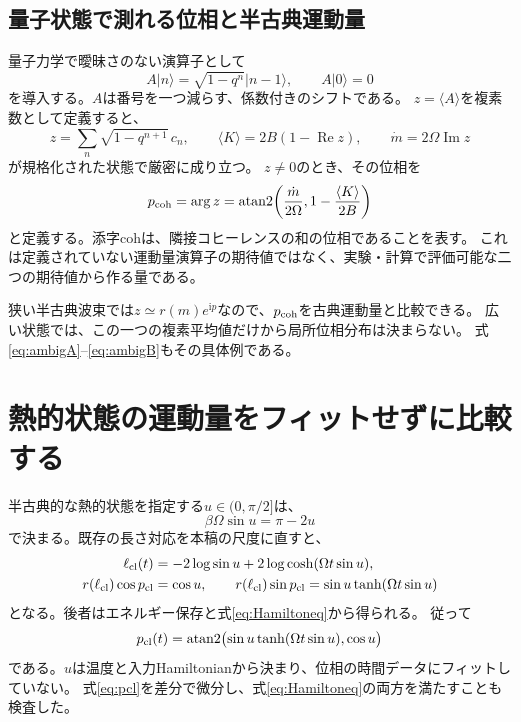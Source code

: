 \documentclass[a4paper,11pt]{ltjsarticle}
\numberwithin{equation}{section}
\newcommand{\ket}[1]{\lvert #1\rangle}
\newcommand{\ii}{\mathrm i}
\begin{document}
\subsection{量子状態で測れる位相と半古典運動量}
量子力学で曖昧さのない演算子として
\begin{equation}
 A\ket n=\sqrt{1-q^n}\ket{n-1},\qquad A\ket0=0
 \label{eq:A}
\end{equation}
を導入する。$A$は番号を一つ減らす、係数付きのシフトである。
$z=\langle A\rangle$を複素数として定義すると、
\begin{equation}
 z=\sum_n\sqrt{1-q^{n+1}}\,c_n,
 \qquad \langle K\rangle=2B(1-\operatorname{Re}z),
 \qquad \dot m=2\Omega\operatorname{Im}z
 \label{eq:z}
\end{equation}
が規格化された状態で厳密に成り立つ。
$z\neq0$のとき、その位相を
\begin{equation}
 p_{\rm coh}=\arg z
 =\operatorname{atan2}\!\left(\frac{\dot m}{2\Omega},1-\frac{\langle K\rangle}{2B}\right)
 \label{eq:pcoh}
\end{equation}
と定義する。添字cohは、隣接コヒーレンスの和の位相であることを表す。
これは定義されていない運動量演算子の期待値ではなく、実験・計算で評価可能な二つの期待値から作る量である。

狭い半古典波束では$z\simeq r(m)e^{\ii p}$なので、$p_{\rm coh}$を古典運動量と比較できる。
広い状態では、この一つの複素平均値だけから局所位相分布は決まらない。
式\eqref{eq:ambigA}--\eqref{eq:ambigB}もその具体例である。

\section{熱的状態の運動量をフィットせずに比較する}
半古典的な熱的状態を指定する$u\in(0,\pi/2]$は、
\begin{equation}
 \beta\Omega\sin u=\pi-2u
 \label{eq:saddle}
\end{equation}
で決まる。既存の長さ対応\cite{Heller}を本稿の尺度に直すと、
\begin{align}
 \ell_{\rm cl}(t)&=-2\log\sin u+2\log\cosh(\Omega t\sin u),
 \label{eq:ellcl}\\
 r(\ell_{\rm cl})\cos p_{\rm cl}&=\cos u,\qquad
 r(\ell_{\rm cl})\sin p_{\rm cl}=\sin u\tanh(\Omega t\sin u)
 \label{eq:orbit}
\end{align}
となる。後者はエネルギー保存と式\eqref{eq:Hamiltoneq}から得られる。
従って
\begin{equation}
 p_{\rm cl}(t)=\operatorname{atan2}
 \bigl(\sin u\tanh(\Omega t\sin u),\cos u\bigr)
 \label{eq:pcl}
\end{equation}
である。$u$は温度と入力Hamiltonianから決まり、位相の時間データにフィットしていない。
式\eqref{eq:pcl}を差分で微分し、式\eqref{eq:Hamiltoneq}の両方を満たすことも検査した。
\end{document}
